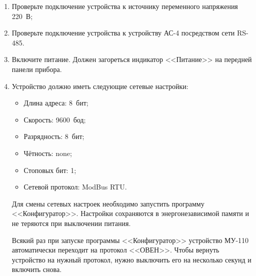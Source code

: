 \begin{enumerate}

\item Проверьте подключение устройства к источнику переменного напряжения 220~В;

\item Проверьте подключение устройства к устройству АС-4 посредством сети RS-485.

\item Включите питание. Должен загореться индикатор <<Питание>> на передней панели прибора.

\item Устройство должно иметь следующие сетевые настройки:

\begin{itemize}
\item Длина адреса: 8~бит;
\item Скорость: 9600~бод;
\item Разрядность: 8~бит;
\item Чётность: none;
\item Стоповых бит: 1;
\item Сетевой протокол: ModBus RTU.
\end{itemize}

Для смены сетевых настроек необходимо запустить программу <<Конфигуратор>>. Настройки сохраняются в энергонезависимой памяти и не теряются при выключении питания.

\IMPORTANT Всякий раз при запуске программы <<Конфигуратор>> устройство МУ-110 автоматически переходит на протокол <<ОВЕН>>. Чтобы вернуть устройство на нужный протокол, нужно выключить его на несколько секунд и включить снова.

\end{enumerate}
